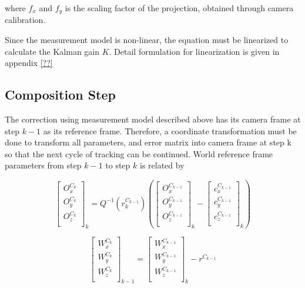 \noindent where $f_{x}$ and $f_{y}$ is the scaling factor of the projection, 
obtained through camera calibration.

Since the measurement model is non-linear, the equation must be
linearized to calculate the Kalman gain $K$. Detail formulation for
linearization is given in appendix \ref{??}

\subsection{Composition Step}

The correction using measurement model described above has its camera
frame at step $k-1$ as its reference frame. Therefore, a coordinate
transformation must be done to transform all parameters, and error
matrix into camera frame at step k so that the next cycle of tracking
can be continued. World reference frame parameters
from step $k-1$ to step $k$ is related by

\begin{equation}
\begin{bmatrix}
O_{x}^{C_{k}} \\
O_{y}^{C_k} \\
O_{z}^{C_k} \\
\end{bmatrix}_{k}=Q^{-1}(r_{k}^{C_{k-1}})\left(
\begin{bmatrix}
O_{x}^{C_{k-1}} \\
O_{y}^{C_{k-1}} \\
O_{z}^{C_{k-1}} \\
\end{bmatrix}_{k}- \begin{bmatrix}
c_{x}^{C_{k-1}} \\
c_{y}^{C_{k-1}} \\
c_{z}^{C_{k-1}} \\
\end{bmatrix}_{k}\right)
\end{equation}

\begin{equation}
\begin{bmatrix}
W_{x}^{C_{k}} \\
W_{y}^{C_{k}} \\
W_{z}^{C_{k}} \\
\end{bmatrix}_{k-1}= \begin{bmatrix}
W_{x}^{C_{k-1}} \\
W_{y}^{C_{k-1}} \\
W_{z}^{C_{k-1}} \\
\end{bmatrix}_{k}-r^{C_{k-1}}
\end{equation}

